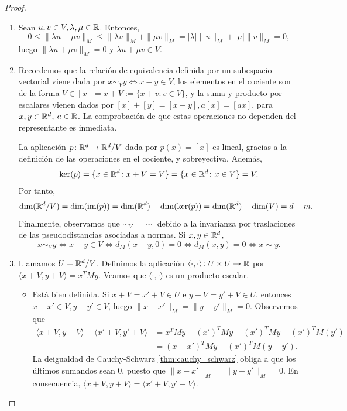 \begin{proof}
    \begin{enumerate}
        \item Sean $u, v \in V, \lambda, \mu \in \mathbb{R}$. Entonces,
        \[0 \le \|\lambda u + \mu v \|_M \le \|\lambda u \|_M+\|\mu v\|_M = |\lambda|\|u\|_M+|\mu|\|v\|_M = 0, \]
        luego $\|\lambda u + \mu v\|_M = 0$ y $\lambda u + \mu v \in V$.

        \item Recordemos que la relación de equivalencia definida por un subespacio vectorial viene dada por $x \sim_V y \iff x - y \in V$, los elementos en el cociente son de la forma $V \in [x] = x+ V := \{x+v \colon v \in V\}$, y la suma y producto por escalares vienen dados por $[x] + [y] = [x+y], a[x] = [ax]$, para $x,y \in \mathbb{R}^d$, $a \in \mathbb{R}$. La comprobación de que estas operaciones no dependen del representante es inmediata. 

        La aplicación $p\colon \mathbb{R}^d \to \mathbb{R}^d/V$ dada por $p(x) = [x]$ es lineal, gracias a la definición de las operaciones en el cociente, y sobreyectiva. Además,
        \[\ker(p) = \{x \in \mathbb{R}^d \colon x + V = V \} = \{x \in \mathbb{R}^d \colon x \in V  \} = V. \]
        Por tanto,
        \[ \dim(\mathbb{R}^d/V) = \dim(\operatorname{im}(p)) = \dim(\mathbb{R}^d) - \dim(\ker(p)) = \dim(\mathbb{R}^d) - \dim(V) = d - m.\]
        Finalmente, observamos que $\sim_{V} = \sim$ debido a la invarianza por traslaciones de las pseudodistancias asociadas a normas. Si $x,y \in \mathbb{R}^d$,
        \[ x \sim_{V} y \iff x-y \in V \iff d_M(x-y,0) = 0 \iff d_M(x,y) = 0  \iff x \sim y.\]

        \item Llamamos $U = \mathbb{R}^d/V$. Definimos la aplicación $\langle \cdot, \cdot \rangle \colon U \times U \to \mathbb{R}$ por $\langle x +V, y+V \rangle = x^TMy$. Veamos que $\langle \cdot, \cdot \rangle$ es un producto escalar.
        \begin{itemize}
            \item Está bien definida. Si $x+V = x'+V \in U$ e $y+V=y'+V \in U$, entonces $x-x' \in V, y-y' \in V$, luego $\|x-x'\|_M = \|y-y'\|_M = 0$. Observemos que
            \begin{align*}
            \langle x+V, y+V \rangle - \langle x' + V, y' + V \rangle &= x^TMy - (x')^TMy + (x')^TMy - (x')^TM(y') \\
                                &= (x - x')^TMy + (x')^TM(y - y').  
            \end{align*}
            La deigualdad de Cauchy-Schwarz \ref{thm:cauchy_schwarz} obliga a que los últimos sumandos sean 0, puesto que $\|x-x'\|_M = \|y-y'\|_M = 0$. En consecuencia, $\langle x+V, y+V \rangle = \langle x' + V, y' + V \rangle$.


\end{itemize}
\end{enumerate}
\end{proof}
